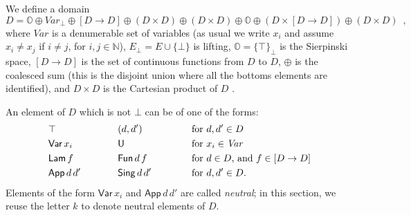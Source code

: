 \documentclass{LMCS}
\theoremstyle{plain}\newtheorem{satz}[thm]{Satz}
\newcommand{\LONGVERSION}[1]{#1}
\newcommand{\SHORTVERSION}[1]{}
\newcommand{\into}{\rightarrow}
\newcommand{\Var}{\mathit{Var}}
\newcommand{\iLam}[1]{\mathsf{Lam}\,#1}
\newcommand{\iNe}[2]{\mathsf{App}\,#1\,#2}
\newcommand{\iPair}[2]{(#1 , #2)}
\newcommand{\iVar}[1]{\mathsf{Var}\,x_{#1}}
\newcommand{\iO}{\top}
\newcommand{\iU}{\mathsf{U}}
\newcommand{\iPi}[2]{\mathsf{Fun}\,#1\,#2}
\newcommand{\iSing}[2]{\mathsf{Sing}\,#1\,{#2}}
\newcommand{\LONGVERSION}[1]{}
\newcommand{\SHORTVERSION}[1]{#1}
\newcommand{\LONGSHORT}[2]{\LONGVERSION{#1}\SHORTVERSION{#2}}
\begin{document}
\begin{defi}
  \label{def:domain}
  We define a domain 
  $$D = \mathbb{O} \oplus \Var_\bot \oplus  [D \into D]
  \oplus (D \times D) \oplus (D \times D)  \oplus \mathbb{O}
  \oplus (D \times [D\into D])
  \oplus (D\times D)\enspace,$$ where $\Var$ is a denumerable set
  of variables (as usual we write $x_i$ and assume $x_i\neq x_j$ if
  $i\neq j$, for $i,j\in \mathbb{N}$), 
  $E_\bot = E \cup \{ \bot \}$ is lifting, $\mathbb{O} = \{\top\}_\bot$ 
  is the Sierpinski
  space, $[D\into D]$ is the set of continuous functions from $D$ to
  $D$, $\oplus$ is the coalesced sum\LONGSHORT{ (this is the
    disjoint union where all the bottoms elements are identified),}{,}
  and $D\times D$ is the Cartesian product of $D$
  \cite{dom-theory}. 



\end{defi}
An element of
$D$ which is not $\bot$ can be of one of the forms:
\begin{align*}
&\iO           & \mbox{\hspace{1cm}}&\iPair{d}{d'}&
\mbox{\hspace{1cm}}&\mbox{for } d, d' \in D\\
&\iVar{i}      & \mbox{\hspace{1cm}}&\iU          &
\mbox{\hspace{1cm}}&\mbox{for } x_i \in \Var\\
&\iLam{f}      & \mbox{\hspace{1cm}}&\iPi{d}{f}    &
\mbox{\hspace{1cm}}&\mbox{for } d\in D\mbox{, and } f \in [D\into D]\\
&\iNe{d}{d'} & \mbox{\hspace{1cm}}&\iSing{d}{d'}  &\
\mbox{\hspace{1cm}}&\mbox{for } d, d' \in D .
\end{align*} 
Elements of the form $\iVar i$ and $\iNe d d'$ are called
\emph{neutral}; in this section, we reuse the letter $k$ to denote
neutral elements of $D$.
\end{document}
